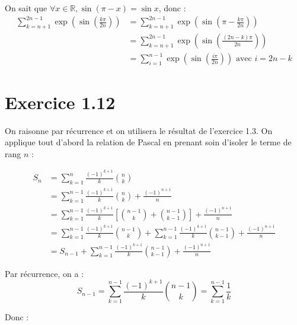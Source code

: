 \documentclass{report}
\begin{document}
On sait que $\forall x \in \mathbb{R}, \sin(\pi - x) = \sin x$, donc :
\begin{equation*}
	\begin{split}
		\sum_{k=n+1}^{2n-1} \exp \left(\sin \left(\frac{k\pi}{2n}\right)\right)
			&= \sum_{k=n+1}^{2n-1} \exp \left(\sin \left(\pi - \frac{k\pi}{2n}\right)\right) \\
			&= \sum_{k=n+1}^{2n-1} \exp \left(\sin \left( \frac{(2n-k)\pi}{2n}\right)\right) \\
			&= \sum_{i=1}^{n-1} \exp \left(\sin \left( \frac{i\pi}{2n}\right)\right) \text{ avec $i = 2n-k$}
	\end{split}
\end{equation*}

\section*{Exercice 1.12}

On raisonne par récurrence et on utilisera le résultat de l'exercice 1.3. On applique tout d'abord la relation
de Pascal en prenant soin d'isoler le terme de rang $n$ :

\begin{equation*}
	\begin{split}
		S_{n} &= \sum_{k=1}^{n} \frac{(-1)^{k+1}}{k}\binom{n}{k} \\
			&= 	\sum_{k=1}^{n-1} \frac{(-1)^{k+1}}{k}\binom{n}{k} + \frac{(-1)^{n+1}}{n} \\
			&= 	\sum_{k=1}^{n-1} \frac{(-1)^{k+1}}{k}\left[\binom{n-1}{k} + \binom{n-1}{k-1}\right] + \frac{(-1)^{n+1}}{n} \\
			&= 	\sum_{k=1}^{n-1} \frac{(-1)^{k+1}}{k}\binom{n-1}{k} + \sum_{k=1}^{n-1} \frac{(-1)^{k+1}}{k}\binom{n-1}{k-1} + \frac{(-1)^{n+1}}{n} \\
			&= 	S_{n-1} + \sum_{k=1}^{n-1} \frac{(-1)^{k+1}}{k}\binom{n-1}{k-1} + \frac{(-1)^{n+1}}{n}
	\end{split}
\end{equation*}

Par récurrence, on a :
\begin{displaymath}
 S_{n-1} = \sum_{k=1}^{n-1} \frac{(-1)^{k+1}}{k}\binom{n-1}{k} = \sum_{k=1}^{n-1} \frac{1}{k}
\end{displaymath}

Donc :
\end{document}
